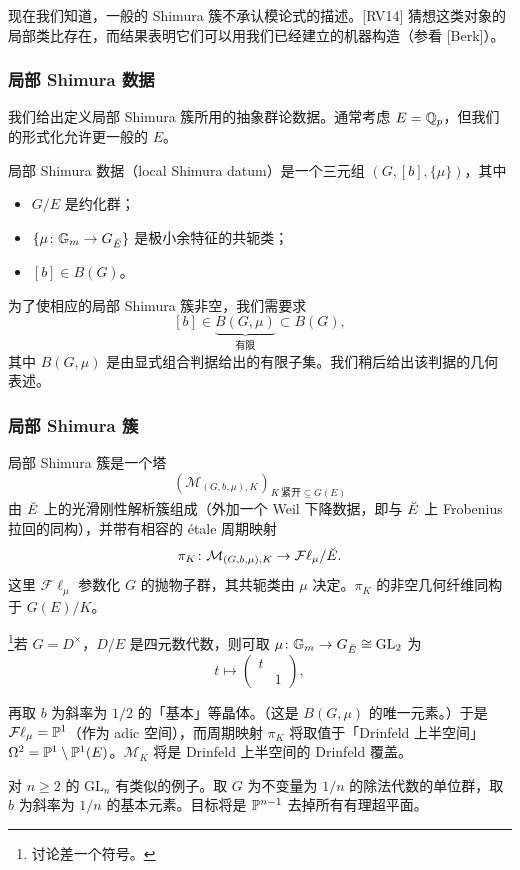 现在我们知道，一般的 Shimura 簇不承认模论式的描述。[RV14] 猜想这类对象的局部类比存在，而结果表明它们可以用我们已经建立的机器构造（参看 [Berk]）。

\subsubsection{局部 Shimura 数据}

我们给出定义局部 Shimura 簇所用的抽象群论数据。通常考虑 $E=\mathbb{Q}_p$，但我们的形式化允许更一般的 $E$。

\begin{definition}
局部 Shimura 数据（local Shimura datum）是一个三元组 $(G,[b],\{\mu\})$，其中
\begin{itemize}
\item $G/E$ 是约化群；
\item $\{\mu\colon\mathbb{G}_m\to G_{\breve{E}}\}$ 是极小余特征的共轭类；
\item $[b]\in B(G)$。
\end{itemize}
\end{definition}

为了使相应的局部 Shimura 簇非空，我们需要求
\[
[b]\in\underbrace{B(G,\mu)}_{\text{有限}}\subset B(G),
\]
其中 $B(G,\mu)$ 是由显式组合判据给出的有限子集。我们稍后给出该判据的几何表述。

\subsubsection{局部 Shimura 簇}

局部 Shimura 簇是一个塔
\[
(\mathcal M_{(G,b,\mu),K})_{K\ \text{紧开}\subseteq G(E)}
\]
由 $\breve{E}$ 上的光滑刚性解析簇组成（外加一个 Weil 下降数据，即与 $\breve{E}$ 上 Frobenius 拉回的同构），并带有相容的 étale 周期映射
\[
\pi_K\colon \mathcal M_{(G,b,\mu),K}\to\mathcal{F}\ell_\mu/\breve{E}.
\]
这里 $\mathcal{F}\ell_\mu$ 参数化 $G$ 的抛物子群，其共轭类由 $\mu$ 决定。$\pi_K$ 的非空几何纤维同构于 $G(E)/K$。

\begin{example}[Drinfeld 情形]
\footnote{讨论差一个符号。}若 $G=D^{\times}$，$D/E$ 是四元数代数，则可取 $\mu\colon\mathbb{G}_m\to G_{\breve{E}}\cong\mathrm{GL}_2$ 为
\[
t\mapsto\begin{pmatrix}t&\\&1\end{pmatrix},
\]


再取 $b$ 为斜率为 $1/2$ 的「基本」等晶体。（这是 $B(G,\mu)$ 的唯一元素。）于是 $\mathcal{F}\ell_\mu=\mathbb{P}^1$（作为 adic 空间），而周期映射 $\pi_K$ 将取值于「Drinfeld 上半空间」$\Omega^2=\mathbb{P}^1\setminus\mathbb{P}^1(E)$。$\mathcal M_K$ 将是 Drinfeld 上半空间的 Drinfeld 覆盖。

对 $n\ge 2$ 的 $\mathrm{GL}_n$ 有类似的例子。取 $G$ 为不变量为 $1/n$ 的除法代数的单位群，取 $b$ 为斜率为 $1/n$ 的基本元素。目标将是 $\mathbb{P}^{n-1}$ 去掉所有有理超平面。
\end{example}

